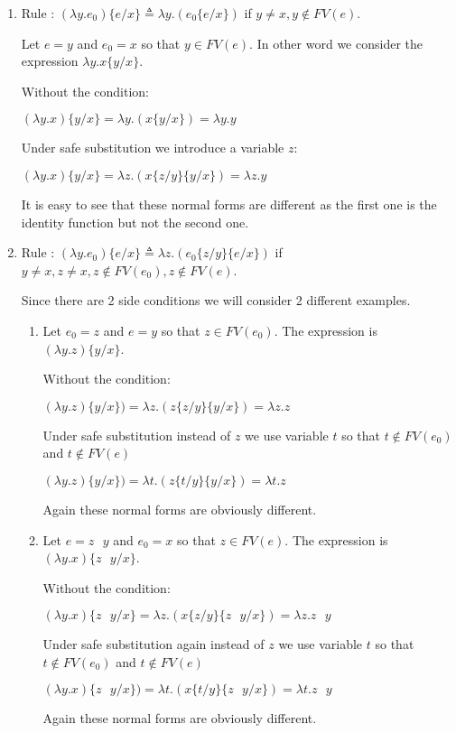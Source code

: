 \documentclass[10pt]{article}
\begin{document}
\begin{enumerate}
\item Rule : $(\lambda y . e_0) \{ e / x\} \triangleq \lambda y . (e_0 \{ e / x \})$ if $y \neq x, y \notin FV(e)$.

Let $e = y$ and $e_0 = x$ so that $y \in FV(e)$. In other word we consider the expression $\lambda y. x \{ y / x\}$.

Without the condition:

$(\lambda y. x )\{ y / x\} = \lambda y . (x \{ y / x \}) = \lambda y. y$

Under safe substitution we introduce a variable $z$:

$(\lambda y. x) \{ y / x\} = \lambda z . (x \{z / y\} \{y / x\}) = \lambda z . y$

It is easy to see that these normal forms are different as the first one is the identity function but not the second one.
\item Rule : $(\lambda y . e_0) \{ e / x\} \triangleq \lambda z . (e_0 \{z / y\}\{ e / x \})$ if $y \neq x, z \neq x, z \notin FV(e_0), z \notin FV(e)$.

Since there are 2 side conditions we will consider 2 different examples.
\begin{enumerate}
\item Let $e_0 = z$ and $e = y$ so that $z \in FV(e_0)$. The expression is $(\lambda y . z) \{ y / x \}$.

Without the condition:

$(\lambda y. z) \{ y / x\}) = \lambda z . (z \{z / y\} \{ y / x \}) = \lambda z. z$

Under safe substitution instead of $z$ we use variable $t$ so that $t \notin FV(e_0)$ and $t \notin FV(e)$

$(\lambda y. z) \{ y / x\}) = \lambda t . (z \{t / y\} \{y / x\}) = \lambda t . z$

Again these normal forms are obviously different.
\item Let $e = z \text{ } y$ and $e_0 = x$ so that $z \in FV(e)$. The expression is $(\lambda y . x) \{ z \text{ } y / x \}$.

Without the condition:

$(\lambda y . x) \{ z \text{ } y / x \}= \lambda z . (x \{z / y\} \{z \text{ } y / x \}) = \lambda z. z \text{ } y$

Under safe substitution again instead of $z$ we use variable $t$ so that $t \notin FV(e_0)$ and $t \notin FV(e)$

$(\lambda y.  x) \{ z \text{ } y / x\}) = \lambda t . (x \{t / y\} \{z \text{ } y / x\}) = \lambda t . z \text{ } y$

Again these normal forms are obviously different.
\end{enumerate}
\end{enumerate}
\end{document}
